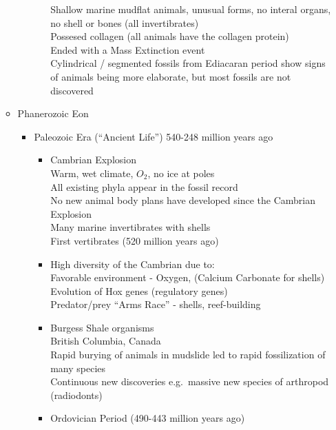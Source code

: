 \documentclass[12pt]{article}
\begin{document}
\begin{itemize}
\begin{itemize}
\begin{itemize}
\begin{itemize}
                    Shallow marine mudflat animals, unusual forms, no interal organs, no shell or bones (all invertibrates) \\
                    Possesed collagen (all animals have the collagen protein) \\
                    Ended with a Mass Extinction event \\
                    Cylindrical / segmented fossils from Ediacaran period show signs of animals being more elaborate, but most fossils are not discovered
                \end{itemize}
            \end{itemize}
            \item Phanerozoic Eon
            \begin{itemize}
                \item Paleozoic Era (``Ancient Life'') 540-248 million years ago
                \begin{itemize}
                    \item Cambrian Explosion \\
                    Warm, wet climate, $O_2$, no ice at poles \\
                    All existing phyla appear in the fossil record \\
                    No new animal body plans have developed since the Cambrian Explosion \\
                    Many marine invertibrates with shells \\
                    First vertibrates (520 million years ago)
                    \item High diversity of the Cambrian due to: \\
                    Favorable environment - Oxygen, (Calcium Carbonate for shells) \\
                    Evolution of Hox genes (regulatory genes) \\
                    Predator/prey ``Arms Race'' - shells, reef-building
                    \item Burgess Shale organisms \\
                    British Columbia, Canada \\
                    Rapid burying of animals in mudslide led to rapid fossilization of many species \\
                    Continuous new discoveries e.g.\ massive new species of arthropod (radiodonts)
                    \item Ordovician Period (490-443 million years ago) \\

\end{itemize}
\end{itemize}
\end{itemize}
\end{itemize}
\end{document}
